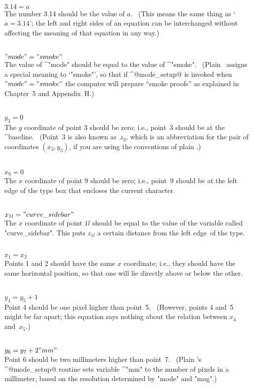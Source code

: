 {{{{\\$3.14=a$\\
The number 3.14 should be the value of $a$. \ (This means the same
thing as `$a=3.14$'; the left and right sides of an equation can be
interchanged without affecting the meaning of that equation in any way.)

\\$"mode"="smoke"$\\
The value of ^"mode" should be equal to the value of ^"smoke". \
(Plain \MF\ assigns a special meaning to `"smoke"', so that if
^@mode\_setup@ is invoked when $"mode"="smoke"$ the computer will
prepare ``smoke proofs'' as explained in Chapter~5 and Appendix~H.)

\\$y_3=0$\\
The $y$ coordinate of point 3 should be zero; i.e., point~3 should
be at the ^{baseline}. \ (Point~3 is also known as~$z_3$, which is an
abbreviation for the pair of coordinates $(x_3,y_3)$, if you are
using the conventions of plain \MF\!.)

\\$x_9=0$\\
The $x$ coordinate of point 9 should be zero; i.e., point~9 should
be at the left edge of the type box that encloses the current character.

\\$x_{1l}="curve\_sidebar"$\\
The $x$ coordinate of point $1l$ should be equal to the value of the
variable called "curve\_sidebar". This puts $z_{1l}$ a certain
distance from the left edge~of the type.

\\$x_1=x_2$\\
Points 1 and 2 should have the same $x$ coordinate; i.e., they should
have the same horizontal position, so that one will lie directly
above or below the other.

\\$y_4=y_5+1$\\
Point 4 should be one pixel higher than point~5.
\ (However, points 4 and~5 might be far apart; this equation
says nothing about the relation between $x_4$ and~$x_5$.)

\\$y_6=y_7+2"mm"$\\
Point 6 should be two millimeters higher than point~7. \ (Plain \MF's
^@mode\_setup@ routine sets variable ^"mm" to the number of pixels in a
millimeter, based on the resolution determined by "mode" and "mag".)

}}}}
